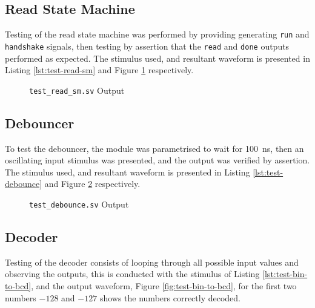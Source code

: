 \FloatBarrier
\subsection{Read State Machine}
Testing of the read state machine was performed by providing generating \texttt{run} and \texttt{handshake} signals, then testing by assertion that the \texttt{read} and \texttt{done} outputs performed as expected. The stimulus used, and resultant waveform is presented in Listing \ref{lst:test-read-sm} and Figure \ref{fig:test-read-sm} respectively.



\begin{figure}[ht]
	\centering
	
	\caption{\texttt{test\_read\_sm.sv} Output}
	\label{fig:test-read-sm}
\end{figure}

\FloatBarrier
\subsection{Debouncer}
To test the debouncer, the module was parametrised to wait for \SI{100}{\nano\second}, then an oscillating input stimulus was presented, and the output was verified by assertion. The stimulus used, and resultant waveform is presented in Listing \ref{lst:test-debounce} and Figure \ref{fig:test-debounce} respectively.



\begin{figure}[ht]
	\centering
	
	\caption{\texttt{test\_debounce.sv} Output}
	\label{fig:test-debounce}
\end{figure}

\FloatBarrier
\subsection{ Decoder}
Testing of the  decoder consists of looping through all possible input values and observing the outputs, this is conducted with the stimulus of Listing \ref{lst:test-bin-to-bcd}, and the output waveform, Figure \ref{fig:test-bin-to-bcd}, for the first two numbers $-128$ and $-127$ shows the numbers correctly decoded.

